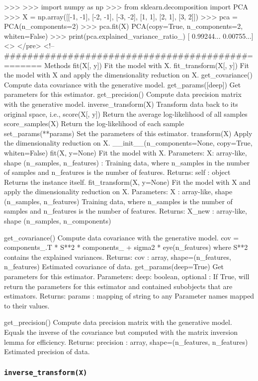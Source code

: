 >>>
>>> import numpy as np
>>> from sklearn.decomposition import PCA
>>> X = np.array([[-1, -1], [-2, -1], [-3, -2], [1, 1], [2, 1], [3, 2]])
>>> pca = PCA(n_components=2)
>>> pca.fit(X)
PCA(copy=True, n_components=2, whiten=False)
>>> print(pca.explained_variance_ratio_) 
[ 0.99244...  0.00755...]
<\code>
</pre>
<!-- ##########################################======== %
Methods
fit(X[, y])	Fit the model with X.
fit_transform(X[, y])	Fit the model with X and apply the dimensionality reduction on X.
get_covariance()	Compute data covariance with the generative model.
get_params([deep])	Get parameters for this estimator.
get_precision()	Compute data precision matrix with the generative model.
inverse_transform(X)	Transform data back to its original space, i.e.,
score(X[, y])	Return the average log-likelihood of all samples
score_samples(X)	Return the log-likelihood of each sample
set_params(**params)	Set the parameters of this estimator.
transform(X)	Apply the dimensionality reduction on X.
__init__(n_components=None, copy=True, whiten=False)
fit(X, y=None)
Fit the model with X.
Parameters:	
X: array-like, shape (n_samples, n_features) :
Training data, where n_samples in the number of samples and n_features is the number of features.
Returns:	
self : object
Returns the instance itself.
fit_transform(X, y=None)
Fit the model with X and apply the dimensionality reduction on X.
Parameters:	
X : array-like, shape (n_samples, n_features)
Training data, where n_samples is the number of samples and n_features is the number of features.
Returns:	
X_new : array-like, shape (n_samples, n_components)

get_covariance()
Compute data covariance with the generative model.
cov = components_.T * S**2 * components_ + sigma2 * eye(n_features) where S**2 contains the explained variances.
Returns:	
cov : array, shape=(n_features, n_features)
Estimated covariance of data.
get_params(deep=True)
Get parameters for this estimator.
Parameters:	
deep: boolean, optional :
If True, will return the parameters for this estimator and contained subobjects that are estimators.
Returns:	
params : mapping of string to any
Parameter names mapped to their values.

get_precision()
Compute data precision matrix with the generative model.
Equals the inverse of the covariance but computed with the matrix inversion lemma for efficiency.
Returns:	
precision : array, shape=(n_features, n_features)
Estimated precision of data.


\subsubsection*{\texttt{inverse_transform(X)}}

